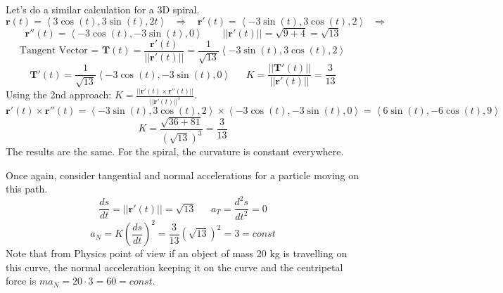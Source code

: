 Let's do a similar calculation for a 3D spiral.
$$\mathbf{r}(t) = \left<  3\cos(t),3\sin(t),2t \right> \ \ \ \Rightarrow \ \ \ \ \mathbf{r'}(t) = \left<  -3\sin(t),3\cos(t),2 \right> \ \ \ \Rightarrow $$
$$  \mathbf{r''}(t) = \left<  -3\cos(t),-3\sin(t),0 \right> \ \ \ \ \ \ \ \ \  ||\mathbf{r'}(t)|| =\sqrt{9+4}  =\sqrt{13}  $$
$$ \text{Tangent Vector = } \mathbf{T}(t) =\frac{\mathbf{r'}(t)}{ ||\mathbf{r'}(t)||} = \frac{1}{\sqrt{13}}\left<  -3\sin(t),3\cos(t),2 \right> $$
$$\mathbf{T'}(t)  =\frac{1}{\sqrt{13}}\left<  -3\cos(t),-3\sin(t),0 \right> \ \ \ \ \ \  \ K = \frac{||\mathbf{T'}(t)||}{ ||\mathbf{r'}(t)||} = \frac{3}{13}$$
Using the 2nd approach: $K = \frac{||\mathbf{r'}(t) \times \mathbf{r''}(t)||}{ ||\mathbf{r'}(t)||^3}$.
$$\mathbf{r'}(t) \times \mathbf{r''}(t) =    \left<  -3\sin(t),3\cos(t),2 \right> \times \left<  -3\cos(t),-3\sin(t),0 \right> =   \left<  6\sin(t),-6\cos(t),9 \right>$$
$$ K = \frac{\sqrt{36+81} }{(\sqrt{13})^3} = \frac{3}{13} $$
The results are the same.   For the spiral, the curvature is constant everywhere.

Once again, consider tangential and normal accelerations for a particle moving on this path.
$$\frac{ds}{dt} = || \mathbf{r'}(t)|| =\sqrt{13}\ \ \ \ \ \ \ a_T = \frac{d^2s}{dt^2} =0$$
$$ a_N = K \left( \frac{ds}{dt} \right)^2 =  \frac{3}{13}(\sqrt{13})^2=3 = const$$Note that from Physics point of view if an object of mass 20 kg is travelling on this curve, the normal acceleration keeping it on the curve and the centripetal force is $ma_N=20\cdot 3=60=const$.


